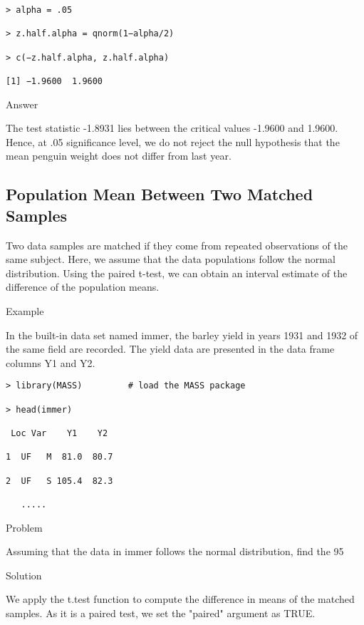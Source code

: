 \begin{framed}
\begin{verbatim}
> alpha = .05 

> z.half.alpha = qnorm(1−alpha/2) 

> c(−z.half.alpha, z.half.alpha) 

[1] −1.9600  1.9600
\end{verbatim}
\end{framed}
Answer

The test statistic -1.8931 lies between the critical values -1.9600 and 1.9600. Hence, at .05 significance level, we do not reject the null hypothesis that the mean penguin weight does not differ from last year.

\subsection{Population Mean Between Two Matched Samples}

Two data samples are matched if they come from repeated observations of the same subject. Here, we assume that the data populations follow the normal distribution. Using the paired t-test, we can obtain an interval estimate of the difference of the population means.


Example

In the built-in data set named immer, the barley yield in years 1931 and 1932 of the same field are recorded. The yield data are presented in the data frame columns Y1 and Y2.

\begin{framed}
\begin{verbatim}
> library(MASS)         # load the MASS package 

> head(immer) 

 Loc Var    Y1    Y2 

1  UF   M  81.0  80.7 

2  UF   S 105.4  82.3 

   .....

\end{verbatim}
\end{framed}
Problem

Assuming that the data in immer follows the normal distribution, find the 95%

Solution

We apply the t.test function to compute the difference in means of the matched samples. As it is a paired test, we set the "paired" argument as TRUE.

